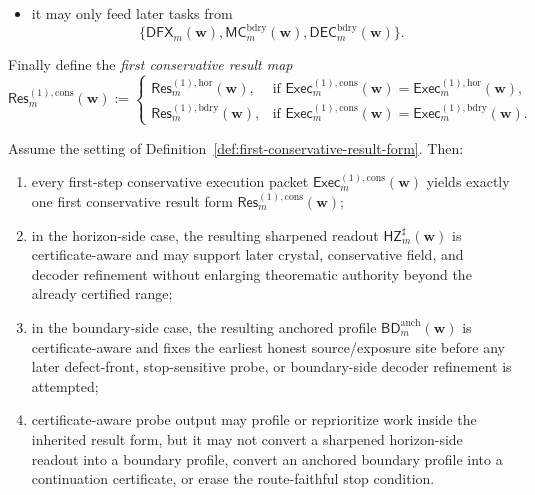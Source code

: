\begin{definition}
\begin{enumerate}[label=(\roman*)]
\begin{itemize}[leftmargin=2em]
 \item it may only feed later tasks from
 \[
 \{\mathsf{DFX}_{m}(\mathbf w),\mathsf{MC}^{\mathrm{bdry}}_{m}(\mathbf w),\mathsf{DEC}^{\mathrm{bdry}}_{m}(\mathbf w)\}.
 \]
 \end{itemize}
\end{enumerate}
Finally define the \emph{first conservative result map}
\[
 \mathsf{Res}^{(1),\mathrm{cons}}_{m}(\mathbf w)
 :=
 \begin{cases}
 \mathsf{Res}^{(1),\mathrm{hor}}_{m}(\mathbf w), & \text{if }\mathsf{Exec}^{(1),\mathrm{cons}}_{m}(\mathbf w)=\mathsf{Exec}^{(1),\mathrm{hor}}_{m}(\mathbf w),\\[2mm]
 \mathsf{Res}^{(1),\mathrm{bdry}}_{m}(\mathbf w), & \text{if }\mathsf{Exec}^{(1),\mathrm{cons}}_{m}(\mathbf w)=\mathsf{Exec}^{(1),\mathrm{bdry}}_{m}(\mathbf w).
 \end{cases}
\]
\end{definition}

\begin{proposition}
\label{prop:every-first-step-execution-packet-yields-exactly-one-first-conservative-result-form}
Assume the setting of Definition~\ref{def:first-conservative-result-form}. Then:
\begin{enumerate}[label=(\roman*)]
 \item every first-step conservative execution packet \(\mathsf{Exec}^{(1),\mathrm{cons}}_{m}(\mathbf w)\) yields exactly one first conservative result form \(\mathsf{Res}^{(1),\mathrm{cons}}_{m}(\mathbf w)\);
 \item in the horizon-side case, the resulting sharpened readout \(\mathsf{HZ}^{\sharp}_{m}(\mathbf w)\) is certificate-aware and may support later crystal, conservative field, and decoder refinement without enlarging theorematic authority beyond the already certified range;
 \item in the boundary-side case, the resulting anchored profile \(\mathsf{BD}^{\mathrm{anch}}_{m}(\mathbf w)\) is certificate-aware and fixes the earliest honest source/exposure site before any later defect-front, stop-sensitive probe, or boundary-side decoder refinement is attempted;
 \item certificate-aware probe output may profile or reprioritize work inside the inherited result form, but it may not convert a sharpened horizon-side readout into a boundary profile, convert an anchored boundary profile into a continuation certificate, or erase the route-faithful stop condition.
\end{enumerate}
\end{proposition}

